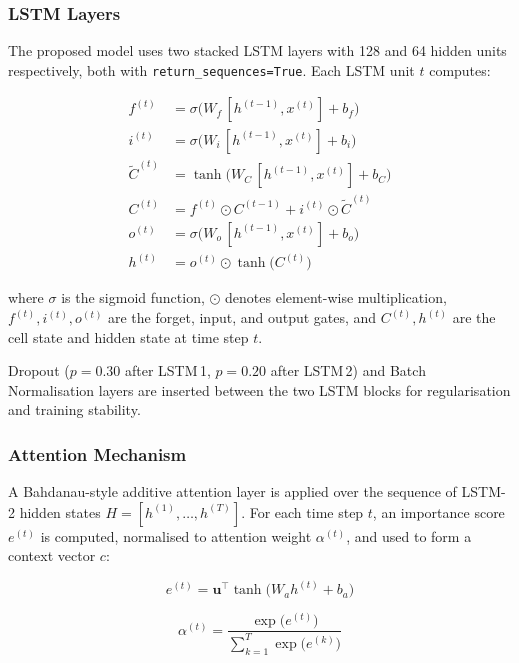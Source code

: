 \documentclass[conference]{IEEEtran}
\begin{document}
\subsubsection{LSTM Layers}
The proposed model uses two stacked LSTM layers with 128 and 64 hidden
units respectively, both with \texttt{return\_sequences=True}.  Each
LSTM unit $t$ computes:

\begin{align}
f^{(t)} &= \sigma\!\bigl(W_f\,[h^{(t-1)},x^{(t)}] + b_f\bigr) \label{eq:forget}\\
i^{(t)} &= \sigma\!\bigl(W_i\,[h^{(t-1)},x^{(t)}] + b_i\bigr) \label{eq:input}\\
\tilde{C}^{(t)} &= \tanh\!\bigl(W_C\,[h^{(t-1)},x^{(t)}] + b_C\bigr) \label{eq:cell_cand}\\
C^{(t)} &= f^{(t)}\odot C^{(t-1)} + i^{(t)}\odot\tilde{C}^{(t)} \label{eq:cell}\\
o^{(t)} &= \sigma\!\bigl(W_o\,[h^{(t-1)},x^{(t)}] + b_o\bigr) \label{eq:output_gate}\\
h^{(t)} &= o^{(t)}\odot\tanh\!\bigl(C^{(t)}\bigr) \label{eq:hidden}
\end{align}

where $\sigma$ is the sigmoid function, $\odot$ denotes element-wise
multiplication, $f^{(t)},i^{(t)},o^{(t)}$ are the forget, input, and
output gates, and $C^{(t)},h^{(t)}$ are the cell state and hidden state
at time step $t$.

Dropout ($p\!=\!0.30$ after LSTM\,1, $p\!=\!0.20$ after LSTM\,2) and
Batch Normalisation layers are inserted between the two LSTM blocks for
regularisation and training stability.

\subsubsection{Attention Mechanism}
A Bahdanau-style additive attention layer is applied over the sequence
of LSTM-2 hidden states $H = [h^{(1)},\ldots,h^{(T)}]$.  For each time
step $t$, an importance score $e^{(t)}$ is computed, normalised to
attention weight $\alpha^{(t)}$, and used to form a context vector $c$:

\begin{equation}
e^{(t)} = \mathbf{u}^\top\tanh\!\bigl(W_a h^{(t)} + b_a\bigr)
\end{equation}

\begin{equation}
\alpha^{(t)} =
\frac{\exp\bigl(e^{(t)}\bigr)}{\displaystyle\sum_{k=1}^{T}\exp\bigl(e^{(k)}\bigr)}
\end{equation}
\end{document}
